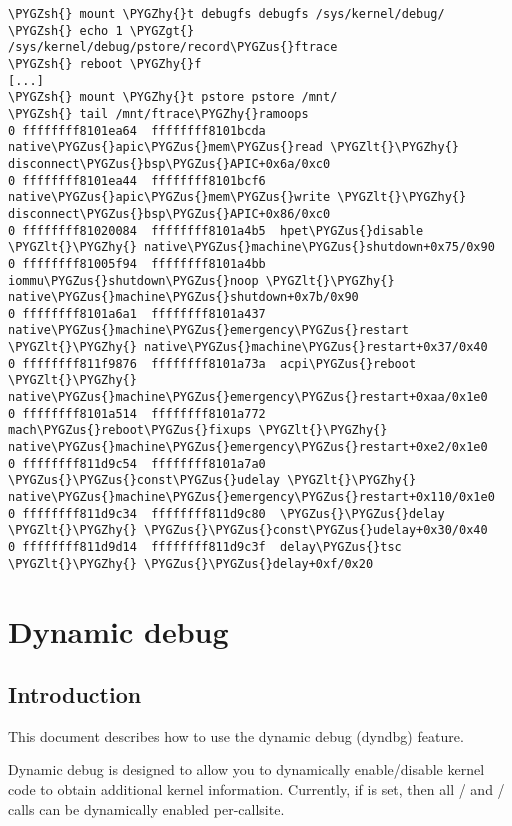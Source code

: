 \documentclass[a4paper,8pt,english]{sphinxmanual}
\def\PYGZus{\char`\_}
\def\PYGZlt{\char`\<}
\def\PYGZgt{\char`\>}
\def\PYGZsh{\char`\#}
\def\PYGZhy{\char`\-}
\begin{document}
\begin{Verbatim}[commandchars=\\\{\}]
\PYGZsh{} mount \PYGZhy{}t debugfs debugfs /sys/kernel/debug/
\PYGZsh{} echo 1 \PYGZgt{} /sys/kernel/debug/pstore/record\PYGZus{}ftrace
\PYGZsh{} reboot \PYGZhy{}f
[...]
\PYGZsh{} mount \PYGZhy{}t pstore pstore /mnt/
\PYGZsh{} tail /mnt/ftrace\PYGZhy{}ramoops
0 ffffffff8101ea64  ffffffff8101bcda  native\PYGZus{}apic\PYGZus{}mem\PYGZus{}read \PYGZlt{}\PYGZhy{} disconnect\PYGZus{}bsp\PYGZus{}APIC+0x6a/0xc0
0 ffffffff8101ea44  ffffffff8101bcf6  native\PYGZus{}apic\PYGZus{}mem\PYGZus{}write \PYGZlt{}\PYGZhy{} disconnect\PYGZus{}bsp\PYGZus{}APIC+0x86/0xc0
0 ffffffff81020084  ffffffff8101a4b5  hpet\PYGZus{}disable \PYGZlt{}\PYGZhy{} native\PYGZus{}machine\PYGZus{}shutdown+0x75/0x90
0 ffffffff81005f94  ffffffff8101a4bb  iommu\PYGZus{}shutdown\PYGZus{}noop \PYGZlt{}\PYGZhy{} native\PYGZus{}machine\PYGZus{}shutdown+0x7b/0x90
0 ffffffff8101a6a1  ffffffff8101a437  native\PYGZus{}machine\PYGZus{}emergency\PYGZus{}restart \PYGZlt{}\PYGZhy{} native\PYGZus{}machine\PYGZus{}restart+0x37/0x40
0 ffffffff811f9876  ffffffff8101a73a  acpi\PYGZus{}reboot \PYGZlt{}\PYGZhy{} native\PYGZus{}machine\PYGZus{}emergency\PYGZus{}restart+0xaa/0x1e0
0 ffffffff8101a514  ffffffff8101a772  mach\PYGZus{}reboot\PYGZus{}fixups \PYGZlt{}\PYGZhy{} native\PYGZus{}machine\PYGZus{}emergency\PYGZus{}restart+0xe2/0x1e0
0 ffffffff811d9c54  ffffffff8101a7a0  \PYGZus{}\PYGZus{}const\PYGZus{}udelay \PYGZlt{}\PYGZhy{} native\PYGZus{}machine\PYGZus{}emergency\PYGZus{}restart+0x110/0x1e0
0 ffffffff811d9c34  ffffffff811d9c80  \PYGZus{}\PYGZus{}delay \PYGZlt{}\PYGZhy{} \PYGZus{}\PYGZus{}const\PYGZus{}udelay+0x30/0x40
0 ffffffff811d9d14  ffffffff811d9c3f  delay\PYGZus{}tsc \PYGZlt{}\PYGZhy{} \PYGZus{}\PYGZus{}delay+0xf/0x20
\end{Verbatim}


\chapter{Dynamic debug}
\label{admin-guide/dynamic-debug-howto:dynamic-debug}\label{admin-guide/dynamic-debug-howto::doc}

\section{Introduction}
\label{admin-guide/dynamic-debug-howto:introduction}
This document describes how to use the dynamic debug (dyndbg) feature.

Dynamic debug is designed to allow you to dynamically enable/disable
kernel code to obtain additional kernel information.  Currently, if
 is set, then all / and
/ calls can be dynamically
enabled per-callsite.
\end{document}

